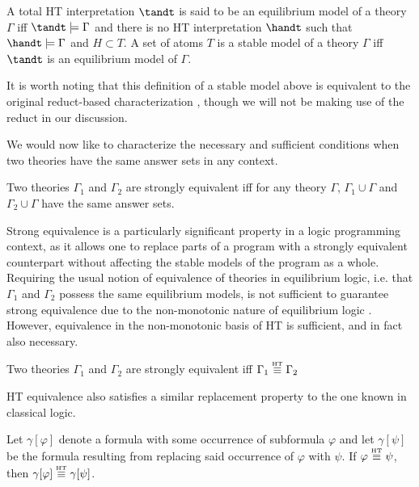\begin{definition}
  A total HT interpretation $\tandt$ is said to be an equilibrium
  model of a theory $\Gamma$ iff $\tandt \models \Gamma$ and there is
  no HT interpretation $\handt$ such that $\handt \models \Gamma$ and
  $H \subset T$. A set of atoms $T$ is a stable model of a theory
  $\Gamma$ iff $\tandt$ is an equilibrium model of $\Gamma$.
\end{definition}

It is worth noting that this definition of a stable model above is
equivalent to the original reduct-based characterization
\cite{lipeva01a}, though we will not be making use of the reduct in
our discussion. 

We would now like to characterize the necessary and sufficient
conditions when two theories have the same answer sets in any context.

\begin{definition}
  Two theories $\Gamma_1$ and $\Gamma_2$ are strongly equivalent iff for
  any theory $\Gamma$, $\Gamma_1 \cup \Gamma$ and
  $\Gamma_2 \cup \Gamma$ have the same answer sets.
\end{definition}

Strong equivalence is a particularly significant property in a logic
programming context, as it allows one to replace parts of a program
with a strongly equivalent counterpart without affecting the stable
models of the program as a whole. Requiring the usual notion of
equivalence of theories in equilibrium logic, i.e. that $\Gamma_1$ and
$\Gamma_2$ possess the same equilibrium models, is not sufficient to
guarantee strong equivalence due to the non-monotonic nature of
equilibrium logic \cite{lipeva01a}.  However, equivalence in the
non-monotonic basis of HT is sufficient, and in fact also necessary.

\begin{proposition}
  Two theories $\Gamma_1$ and $\Gamma_2$ are strongly equivalent
  iff $\Gamma_1 \stackrel{\normalfont\mbox{\tiny HT}}{\equiv} \Gamma_2$
\end{proposition}

HT equivalence also satisfies a similar replacement property
to the one known in classical logic.

\begin{proposition}
  Let $\gamma[\varphi]$ denote a formula with some occurrence of
  subformula $\varphi$ and let $\gamma[\psi]$ be the formula resulting
  from replacing said occurrence of $\varphi$ with $\psi$. If
  $\varphi \stackrel{\normalfont\mbox{\tiny HT}}{\equiv} \psi$, then $\gamma[\varphi] \stackrel{\normalfont\mbox{\tiny HT}}{\equiv} \gamma[\psi]$.
\end{proposition}